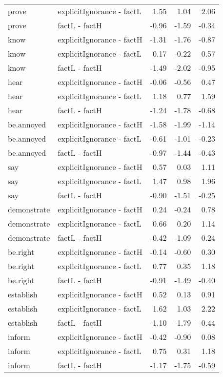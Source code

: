 \begin{longtable}{llrrr}
  prove & explicitIgnorance - factL & 1.55 & 1.04 & 2.06 \\ 
  prove & factL - factH & -0.96 & -1.59 & -0.34 \\ 
  know & explicitIgnorance - factH & -1.31 & -1.76 & -0.87 \\ 
  know & explicitIgnorance - factL & 0.17 & -0.22 & 0.57 \\ 
  know & factL - factH & -1.49 & -2.02 & -0.95 \\ 
  hear & explicitIgnorance - factH & -0.06 & -0.56 & 0.47 \\ 
  hear & explicitIgnorance - factL & 1.18 & 0.77 & 1.59 \\ 
  hear & factL - factH & -1.24 & -1.78 & -0.68 \\ 
  be.annoyed & explicitIgnorance - factH & -1.58 & -1.99 & -1.14 \\ 
  be.annoyed & explicitIgnorance - factL & -0.61 & -1.01 & -0.23 \\ 
  be.annoyed & factL - factH & -0.97 & -1.44 & -0.43 \\ 
  say & explicitIgnorance - factH & 0.57 & 0.03 & 1.11 \\ 
  say & explicitIgnorance - factL & 1.47 & 0.98 & 1.96 \\ 
  say & factL - factH & -0.90 & -1.51 & -0.25 \\ 
  demonstrate & explicitIgnorance - factH & 0.24 & -0.24 & 0.78 \\ 
  demonstrate & explicitIgnorance - factL & 0.66 & 0.20 & 1.14 \\ 
  demonstrate & factL - factH & -0.42 & -1.09 & 0.24 \\ 
  be.right & explicitIgnorance - factH & -0.14 & -0.60 & 0.30 \\ 
  be.right & explicitIgnorance - factL & 0.77 & 0.35 & 1.18 \\ 
  be.right & factL - factH & -0.91 & -1.49 & -0.40 \\ 
  establish & explicitIgnorance - factH & 0.52 & 0.13 & 0.91 \\ 
  establish & explicitIgnorance - factL & 1.62 & 1.03 & 2.22 \\ 
  establish & factL - factH & -1.10 & -1.79 & -0.44 \\ 
  inform & explicitIgnorance - factH & -0.42 & -0.90 & 0.08 \\ 
  inform & explicitIgnorance - factL & 0.75 & 0.31 & 1.18 \\ 
  inform & factL - factH & -1.17 & -1.75 & -0.59 \\ 

\end{longtable}
